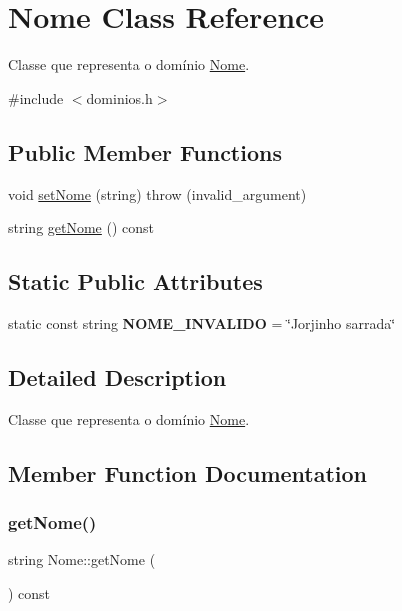 \hypertarget{classNome}{}\section{Nome Class Reference}
\label{classNome}


Classe que representa o domínio \hyperlink{classNome}{Nome}.  




{\ttfamily \#include $<$dominios.\+h$>$}

\subsection*{Public Member Functions}
\begin{DoxyCompactItemize}
\item 
void \hyperlink{classNome_ab1507b81047efb89b50b6be0d33c08e5}{set\+Nome} (string)  throw (invalid\+\_\+argument)
\item 
string \hyperlink{classNome_a1c08f5b9827a1e97a2631196ff99fdef}{get\+Nome} () const
\end{DoxyCompactItemize}
\subsection*{Static Public Attributes}
\begin{DoxyCompactItemize}
\item 
\mbox{\label{classNome_ace6cbb4a02bd6f98c31eeddf936b904e}} 
static const string {\bfseries N\+O\+M\+E\+\_\+\+I\+N\+V\+A\+L\+I\+DO} = \char`\"{}Jorjinho sarrada\char`\"{}
\end{DoxyCompactItemize}


\subsection{Detailed Description}
Classe que representa o domínio \hyperlink{classNome}{Nome}. 

\subsection{Member Function Documentation}
\mbox{\label{classNome_a1c08f5b9827a1e97a2631196ff99fdef}} 
\subsubsection{\texorpdfstring{get\+Nome()}{getNome()}}
{\footnotesize\ttfamily string Nome\+::get\+Nome (\begin{DoxyParamCaption}{ }\end{DoxyParamCaption}) const\hspace{0.3cm}{\ttfamily [inline]}}

